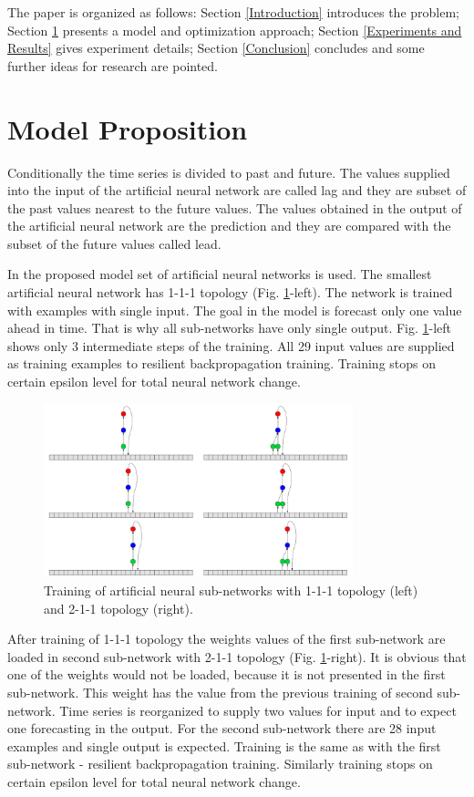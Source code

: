 \documentclass[11pt]{article}
\begin{document}
The paper is organized as follows: Section \ref{Introduction} introduces the problem; Section \ref{Model Proposition} presents a model and optimization approach; Section \ref{Experiments and Results} gives experiment details; Section \ref{Conclusion} concludes and some further ideas for research are pointed.

\section{Model Proposition} \label{Model Proposition}

Conditionally the time series is divided to past and future. The values supplied into the input of the artificial neural network are called lag and they are subset of the past values nearest to the future values. The values obtained in the output of the artificial neural network are the prediction and they are compared with the subset of the future values called lead. 

In the proposed model set of artificial neural networks is used. The smallest artificial neural network has 1-1-1 topology (Fig. \ref{fig:pic01}-left). The network is trained with examples with single input. The goal in the model is forecast only one value ahead in time. That is why all sub-networks have only single output. Fig. \ref{fig:pic01}-left shows only 3 intermediate steps of the training. All 29 input values are supplied as training examples to resilient backpropagation training. Training stops on certain epsilon level for total neural network change.

\begin{figure}[ht!]
   \centering
     \includegraphics[width=0.8\textwidth]{pic01}
    \caption {Training of artificial neural sub-networks with 1-1-1 topology (left) and 2-1-1 topology (right).}
\label{fig:pic01}
\end{figure}
\FloatBarrier

After training of 1-1-1 topology the weights values of the first sub-network are loaded in second sub-network with 2-1-1 topology (Fig. \ref{fig:pic01}-right). It is obvious that one of the weights would not be loaded, because it is not presented in the first sub-network. This weight has the value from the previous training of second sub-network. Time series is reorganized to supply two values for input and to expect one forecasting in the output. For the second sub-network there are 28 input examples and single output is expected. Training is the same as with the first sub-network - resilient backpropagation training. Similarly training stops on certain epsilon level for total neural network change.
\end{document}
